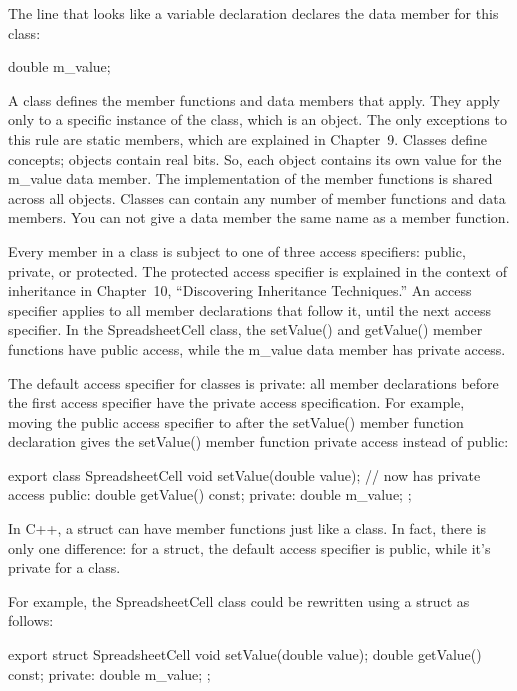 The line that looks like a variable declaration declares the data member for this class:

\begin{cpp}
double m_value;
\end{cpp}

A class defines the member functions and data members that apply. They apply only to a specific instance of the class, which is an object. The only exceptions to this rule are static members, which are explained in Chapter 9. Classes define concepts; objects contain real bits. So, each object contains its own value for the m\_value data member. The implementation of the member functions is shared across all objects. Classes can contain any number of member functions and data members. You can not give a data member the same name as a member function.


Every member in a class is subject to one of three access specifiers: public, private, or protected. The protected access specifier is explained in the context of inheritance in Chapter 10, “Discovering Inheritance Techniques.” An access specifier applies to all member declarations that follow it, until the next access specifier. In the SpreadsheetCell class, the setValue() and getValue() member functions have public access, while the m\_value data member has private access.

The default access specifier for classes is private: all member declarations before the first access specifier have the private access specification. For example, moving the public access specifier to after the setValue() member function declaration gives the setValue() member function private access instead of public:

\begin{cpp}
export class SpreadsheetCell
{
        void setValue(double value); // now has private access
    public:
        double getValue() const;
    private:
        double m_value;
};
\end{cpp}

In C++, a struct can have member functions just like a class. In fact, there is only one difference: for a struct, the default access specifier is public, while it’s private for a class.

For example, the SpreadsheetCell class could be rewritten using a struct as follows:

\begin{cpp}
export struct SpreadsheetCell
{
    void setValue(double value);
        double getValue() const;
    private:
        double m_value;
};
\end{cpp}

